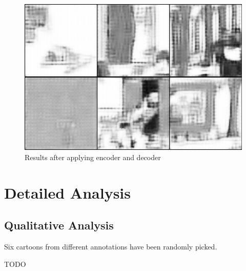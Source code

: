 \documentclass[draft,final,oneside]{vutinfth} %
\begin{document}
\begin{figure}[ht]
	\centering
  	\includegraphics[width=1.0\textwidth]{graphics/autoencoder_final.png}
	\caption{Results after applying encoder and decoder}
	\label{fig:autoencoderresults}
\end{figure}


\section{Detailed Analysis}


\subsection{Qualitative Analysis}
Six cartoons from different annotations have been randomly picked.

TODO
\end{document}
